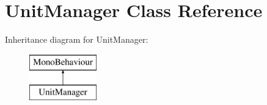 \hypertarget{class_unit_manager}{}\section{Unit\+Manager Class Reference}
\label{class_unit_manager}
Inheritance diagram for Unit\+Manager\+:\begin{figure}[H]
\begin{center}
\leavevmode
\includegraphics[height=2.000000cm]{class_unit_manager}
\end{center}
\end{figure}

